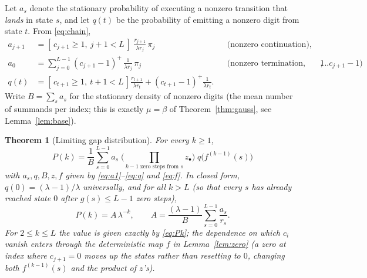 \documentclass[12pt]{article}
\newtheorem{theorem}{Theorem}
\theoremstyle{definition}
\begin{document}
Let $a_s$ denote the stationary probability of executing a nonzero transition
that \emph{lands} in state $s$, and let $q(t)$ be the probability of emitting a
nonzero digit from state $t$. From \eqref{eq:chain},
\begin{align}
a_{j+1}&=[\,c_{j+1}\ge1,\ j+1<L\,]\;\frac{r_{j+1}}{\lambda r_j}\,\pi_j
&&\text{(nonzero continuation)},\label{eq:a1}\\
a_0&=\sum_{j=0}^{L-1}(c_{j+1}-1)^{+}\,\frac{1}{\lambda r_j}\,\pi_j
&&\text{(nonzero termination, digits $1..c_{j+1}-1$)},\label{eq:a0}\\
q(t)&=[\,c_{t+1}\ge1,\ t+1<L\,]\frac{r_{t+1}}{\lambda r_t}
+(c_{t+1}-1)^{+}\frac{1}{\lambda r_t}.\label{eq:q}
\end{align}
Write $B=\sum_{s}a_s$ for the stationary density of nonzero digits (the mean
number of summands per index; this is exactly $\mu=\beta$ of
Theorem~\ref{thm:gauss}, see Lemma~\ref{lem:base}).

\begin{theorem}[Limiting gap distribution]\label{thm:gap}
For every $k\ge1$,
\begin{equation}\label{eq:Pk}
\boxed{\;
P(k)=\frac{1}{B}\sum_{s=0}^{L-1} a_s\;\Big(\prod_{\text{$k-1$ zero steps from $s$}}z_\bullet\Big)\;q\big(f^{(k-1)}(s)\big)\; }
\end{equation}
with $a_s,q,B,z,f$ given by \eqref{eq:a1}--\eqref{eq:q} and
\eqref{eq:f}. In closed form, $q(0)=(\lambda-1)/\lambda$ universally, and for
all $k>L$ (so that every $s$ has already reached state $0$ after $g(s)\le L-1$
zero steps),
\begin{equation}\label{eq:tail}
P(k)=A\,\lambda^{-k},\qquad
A=\frac{(\lambda-1)}{B}\sum_{s=0}^{L-1}\frac{a_s}{r_s}.
\end{equation}
For $2\le k\le L$ the value is given exactly by \eqref{eq:Pk}; the dependence on
which $c_i$ vanish enters through the deterministic map $f$ in
Lemma~\ref{lem:zero} (a zero at index where $c_{j+1}=0$ moves up the states
rather than resetting to $0$, changing both $f^{(k-1)}(s)$ and the product of
$z$'s).
\end{theorem}
\end{document}
